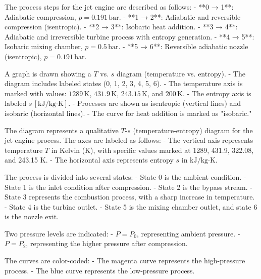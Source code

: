 The process steps for the jet engine are described as follows:  
- **0 → 1**: Adiabatic compression, \( p = 0.191 \, \text{bar} \).  
- **1 → 2**: Adiabatic and reversible compression (isentropic).  
- **2 → 3**: Isobaric heat addition.  
- **3 → 4**: Adiabatic and irreversible turbine process with entropy generation.  
- **4 → 5**: Isobaric mixing chamber, \( p = 0.5 \, \text{bar} \).  
- **5 → 6**: Reversible adiabatic nozzle (isentropic), \( p = 0.191 \, \text{bar} \).  

A graph is drawn showing a \( T \) vs. \( s \) diagram (temperature vs. entropy).  
- The diagram includes labeled states (0, 1, 2, 3, 4, 5, 6).  
- The temperature axis is marked with values: \( 1289 \, \text{K} \), \( 431.9 \, \text{K} \), \( 243.15 \, \text{K} \), and \( 200 \, \text{K} \).  
- The entropy axis is labeled \( s \, [\text{kJ}/\text{kg·K}] \).  
- Processes are shown as isentropic (vertical lines) and isobaric (horizontal lines).  
- The curve for heat addition is marked as "isobaric."

The diagram represents a qualitative \( T \)-\( s \) (temperature-entropy) diagram for the jet engine process. The axes are labeled as follows:  
- The vertical axis represents temperature \( T \) in Kelvin (K), with specific values marked at 1289, 431.9, 322.08, and 243.15 K.  
- The horizontal axis represents entropy \( s \) in \( \text{kJ/kg·K} \).  

The process is divided into several states:  
- State 0 is the ambient condition.  
- State 1 is the inlet condition after compression.  
- State 2 is the bypass stream.  
- State 3 represents the combustion process, with a sharp increase in temperature.  
- State 4 is the turbine outlet.  
- State 5 is the mixing chamber outlet, and state 6 is the nozzle exit.  

Two pressure levels are indicated:  
- \( P = P_0 \), representing ambient pressure.  
- \( P = P_2 \), representing the higher pressure after compression.  

The curves are color-coded:  
- The magenta curve represents the high-pressure process.  
- The blue curve represents the low-pressure process.